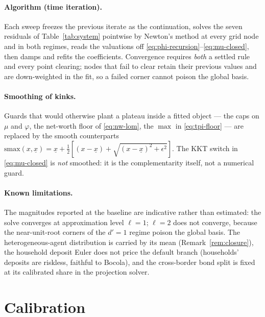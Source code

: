 \documentclass[11pt]{article}
\numberwithin{equation}{section}
\theoremstyle{definition}
\theoremstyle{plain}
\theoremstyle{remark}
\begin{document}
\paragraph{Algorithm (time iteration).} Each sweep freezes the previous iterate as
the continuation, solves the seven residuals of Table~\ref{tab:system} pointwise by
Newton's method at every grid node and in both regimes, reads the valuations off
\eqref{eq:phi-recursion}--\eqref{eq:mu-closed}, then damps and refits the
coefficients. Convergence requires \emph{both} a settled rule and every point
clearing; nodes that fail to clear retain their previous values and are
down-weighted in the fit, so a failed corner cannot poison the global basis.

\paragraph{Smoothing of kinks.} Guards that would otherwise plant a plateau inside a
fitted object --- the caps on $\mu$ and $\varphi$, the net-worth floor of
\eqref{eq:nw-lom}, the $\max$ in \eqref{eq:tpi-floor} --- are replaced by the smooth
counterparts $\mathrm{smax}(x,\underline{x})=\underline{x}+\tfrac12[(x-\underline{x})
+\sqrt{(x-\underline{x})^2+\epsilon^2}]$. The KKT switch in \eqref{eq:mu-closed} is
\emph{not} smoothed: it is the complementarity itself, not a numerical guard.

\paragraph{Known limitations.} The magnitudes reported at the baseline are indicative
rather than estimated: the solve converges at approximation level $\ell=1$; $\ell=2$
does not converge, because the near-unit-root corners of the $d'=1$ regime poison the
global basis. The heterogeneous-agent distribution is carried by its mean
(Remark~\ref{rem:closure}), the household deposit Euler does not price the default
branch (households' deposits are riskless, faithful to Bocola), and the cross-border
bond split is fixed at its calibrated share in the projection solver.

\section{Calibration}
\end{document}
